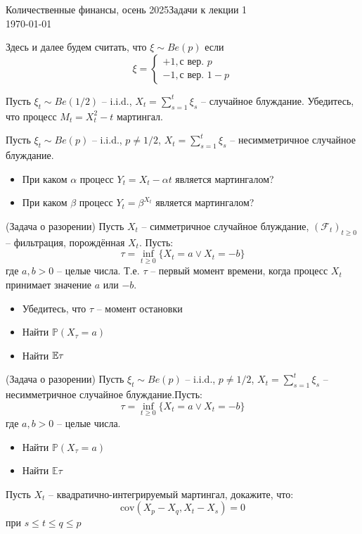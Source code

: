 \documentclass[12pt]{article}
\begin{document}
\noindent Количественные финансы, осень 2025\hfill Задачи к лекции 1\\
\today

\hrulefill

Здесь и далее будем считать, что $\xi \sim Be(p)$ если
$$
    \xi = \begin{cases}
        +1, \text{с вер. } p\\
        -1, \text{с вер. } 1-p
    \end{cases}
$$

\begin{problem}
    Пусть $\xi_t \sim Be(1/2)$ -- i.i.d., $X_t = \sum_{s=1}^t \xi_s$ -- случайное блуждание. Убедитесь, что процесс $M_t = X_t^2 - t$ мартингал.
\end{problem}

\begin{problem}
    Пусть $\xi_t \sim Be(p)$ -- i.i.d., $p\neq 1/2$, $X_t = \sum_{s=1}^t \xi_s$ -- несимметричное случайное блуждание.

    \begin{itemize}
        \item При каком $\alpha$ процесс $Y_t = X_t - \alpha t$ является мартингалом?
        \item При каком $\beta$ процесс $Y_t = \beta^{X_t}$ является мартингалом?
    \end{itemize}
\end{problem}

\begin{problem}(Задача о разорении)
    Пусть $X_t$ -- симметричное случайное блуждание, $(\mathcal{F}_t)_{t\geq0}$ -- фильтрация, порождённая $X_t$. Пусть:
    $$
        \tau = \inf_{t \geq 0} \{ X_t = a \lor X_t =-b\}
    $$где $a, b > 0$ -- целые числа. Т.е. $\tau$ -- первый момент времени, когда процесс $X_t$ принимает значение $a$ или $-b$.

    \begin{itemize}
        \item Убедитесь, что $\tau$ -- момент остановки
        \item Найти $\mathbb{P}(X_{\tau} = a)$
        \item Найти $\mathbb{E} \tau$
    \end{itemize}
\end{problem}

\begin{problem}(Задача о разорении)
    Пусть $\xi_t \sim Be(p)$ -- i.i.d., $p\neq 1/2$, $X_t = \sum_{s=1}^t \xi_s$ -- несимметричное случайное блуждание.Пусть:
    $$
        \tau = \inf_{t \geq 0} \{ X_t = a \lor X_t =-b\}
    $$где $a, b > 0$ -- целые числа.

    \begin{itemize}
        \item Найти $\mathbb{P}(X_{\tau} = a)$
        \item Найти $\mathbb{E}\tau$
    \end{itemize}
\end{problem}

\begin{problem}
    Пусть $X_t$ -- квадратично-интегрируемый мартингал, докажите, что:
    $$
        \mathrm{cov} (X_p - X_q, X_t - X_s) = 0
    $$ при $s \leq t \leq q \leq p$
\end{problem}
\end{document}
